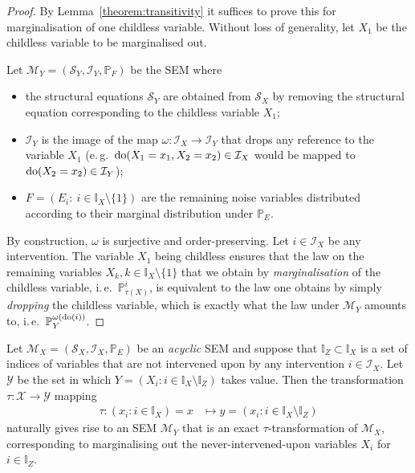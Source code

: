 \begin{proof}
By Lemma~\ref{theorem:transitivity} it suffices to prove this for marginalisation of one childless variable.
Without loss of generality, let $X_1$ be the childless variable to be marginalised out.

Let $\mathcal{M}_Y=(\mathcal{S}_Y,\mathcal{I}_Y,\mathbb{P}_F)$ be the SEM where
%
\begin{itemize}
    \item the structural equations $\mathcal{S}_Y$ are obtained from $\mathcal{S}_X$ by removing the structural equation corresponding to the childless variable $X_1$;
    \item $\mathcal{I}_Y$ is the image of the map $\omega:\mathcal{I}_X \to \mathcal{I}_Y$ that drops any reference to the variable $X_1$ (e.\,g.\ ${\operatorname{do}( X_1=x_1, X_2=x_2) \in \mathcal{I}_X}$ would be mapped to $\operatorname{do}(X_2=x_2) \in \mathcal{I}_Y$);
    \item $F = (E_i:\ i \in \mathbb{I}_X\setminus\{1\})$ are the remaining noise variables distributed according to their marginal distribution under $\mathbb{P}_E$.
\end{itemize}
%
By construction, $\omega$ is surjective and order-preserving.
Let $i\in\mathcal{I}_X$ be any intervention.
The variable $X_1$ being childless ensures that the law on the remaining variables $X_k,k\in\mathbb{I}_X\setminus\{1\}$ that we obtain by \emph{marginalisation} of the childless variable, i.\,e.\ $\mathbb{P}_{\tau(X)}^{i}$, is equivalent to the law one obtains by simply \emph{dropping} the childless variable, which is exactly what the law under $\mathcal{M}_Y$ amounts to, i.\,e.\ $\mathbb{P}_Y^{\omega({\operatorname{do}(i)})}$.
\end{proof}


\medskip


\begin{theorem}\label{theorem:never_intervened}
Let $\mathcal{M}_X=(\mathcal{S}_X,\mathcal{I}_X,\mathbb{P}_E)$ be an \emph{acyclic} SEM and suppose that ${\mathbb{I}_Z\subset\mathbb{I}_X}$ is a set of indices of variables that are not intervened upon by any intervention $i\in\mathcal{I}_X$.
Let $\mathcal{Y}$ be the set in which $Y = \left( X_i: i\in\mathbb{I}_X\setminus \mathbb{I}_Z \right)$ takes value.
Then the transformation $\tau: \mathcal{X} \to \mathcal{Y}$ mapping
\begin{align*}
   \tau: \left( x_i: i\in\mathbb{I}_X \right) = x &\mapsto y = \left( x_i: i\in\mathbb{I}_X\setminus \mathbb{I}_Z \right)
\end{align*}
naturally gives rise to an SEM $\mathcal{M}_Y$ that is an exact $\tau$-transformation of $\mathcal{M}_X$, corresponding to marginalising out the never-intervened-upon variables $X_i$ for $i\in\mathbb{I}_Z$.
\end{theorem}

